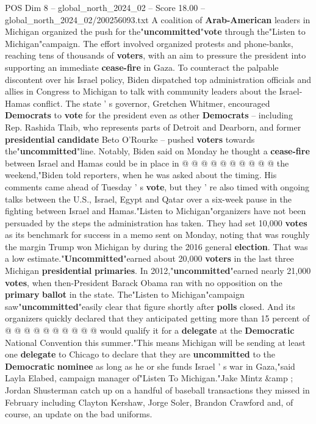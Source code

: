 \begin{textsample}{POS Dim 8 – global\_north\_2024\_02 – Score 18.00 – global\_north\_2024\_02/200256093.txt}
A coalition of \textbf{Arab-American} leaders in Michigan organized the push for the"\textbf{uncommitted}"\textbf{vote} through the"Listen to Michigan"campaign.
The effort involved organized protests and phone-banks, reaching tens of thousands of \textbf{voters}, with an aim to pressure the president into supporting an immediate \textbf{cease-fire} in Gaza.
To counteract the palpable discontent over his Israel policy, Biden dispatched top administration officials and allies in Congress to Michigan to talk with community leaders about the Israel-Hamas conflict.
The state ' s governor, Gretchen Whitmer, encouraged \textbf{Democrats} to \textbf{vote} for the president even as other \textbf{Democrats} -- including Rep.
Rashida Tlaib, who represents parts of Detroit and Dearborn, and former \textbf{presidential} \textbf{candidate} Beto O'Rourke -- pushed \textbf{voters} towards the"\textbf{uncommitted}"line.
Notably, Biden said on Monday he thought a \textbf{cease-fire} between Israel and Hamas could be in place in @ @ @ @ @ @ @ @ @ @ the weekend,"Biden told reporters, when he was asked about the timing.
His comments came ahead of Tuesday ' s \textbf{vote}, but they ' re also timed with ongoing talks between the U.S., Israel, Egypt and Qatar over a six-week pause in the fighting between Israel and Hamas."Listen to Michigan"organizers have not been persuaded by the steps the administration has taken.
They had set 10,000 \textbf{votes} as its benchmark for success in a memo sent on Monday, noting that was roughly the margin Trump won Michigan by during the 2016 general \textbf{election}.
That was a low estimate."\textbf{Uncommitted}"earned about 20,000 \textbf{voters} in the last three Michigan \textbf{presidential} \textbf{primaries}.
In 2012,"\textbf{uncommitted}"earned nearly 21,000 \textbf{votes}, when then-President Barack Obama ran with no opposition on the \textbf{primary} \textbf{ballot} in the state.
The"Listen to Michigan"campaign saw"\textbf{uncommitted}"easily clear that figure shortly after \textbf{polls} closed.
And its organizers quickly declared that they anticipated getting more than 15 percent of @ @ @ @ @ @ @ @ @ @ would qualify it for a \textbf{delegate} at the \textbf{Democratic} National Convention this summer."This means Michigan will be sending at least one \textbf{delegate} to Chicago to declare that they are \textbf{uncommitted} to the \textbf{Democratic} \textbf{nominee} as long as he or she funds Israel ' s war in Gaza,"said Layla Elabed, campaign manager of"Listen To Michigan."Jake Mintz \&amp ; Jordan Shusterman catch up on a handful of baseball transactions they missed in February including Clayton Kershaw, Jorge Soler, Brandon Crawford and, of course, an update on the bad uniforms.

\end{textsample}
